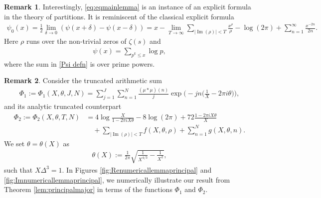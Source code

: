 \documentclass[11pt]{amsart}
\numberwithin{equation}{section}
\numberwithin{figure}{section}
\theoremstyle{definition}
\newtheorem{remark}{Remark}[section]
\begin{document}
\begin{remark}
Interestingly, \eqref{eq:eqmainlemma} is an instance of an explicit formula in the theory of partitions. It is reminiscent of the classical explicit formula
\begin{align*}
    \psi_0(x) = \frac{1}{2} \lim_{\delta \to 0} (\psi(x+\delta)-\psi(x-\delta)) = x - \lim_{T \to \infty}\sum_{\lvert \operatorname{Im}(\rho) \rvert <T} \frac{x^\rho}{\rho} - \log(2\pi) + \sum_{n=1}^{\infty} \frac{x^{-2n}}{2n}.
\end{align*}
Here $\rho$ runs over the non-trivial zeros of $\zeta(s)$ and
\begin{align}\label{Psi defn}
    \psi(x) = \sum_{p^k \leqslant x} \log p,
\end{align}
where the sum in \eqref{Psi defn} is over prime powers.
\end{remark}
\begin{remark}
Consider the truncated arithmetic sum
\begin{align*} %
    \Phi_1 := \Phi_{1}(X,\theta, J, N) = \sum_{j=1}^J \sum_{n=1}^N \frac{(\mu * \mu)(n)}{j} \exp\bigg( -jn \bigg(\frac{1}{X}-2\pi i \theta\bigg)\bigg),
\end{align*}
and its analytic truncated counterpart
\begin{align*} 
\Phi_2 := \Phi_{2}(X,\theta,T,N) &= 4 \log \frac{X}{1-2\pi i X\theta} - 8 \log(2 \pi) + 72 \frac{1-2\pi i X\theta}{X} \\
&\quad+ \sum_{\lvert \operatorname{Im}(\rho) \rvert < T}  f(X,\theta,\rho)  +\sum_{n=1}^{N} g(X,\theta,n) .
\end{align*}
We set $\theta=\theta(X)$ as
\begin{align*}
    \theta(X) := \frac{1}{2\pi} \sqrt{\frac{1}{X^{4/3}}-\frac{1}{X^2}},
\end{align*}
such that $X \Delta^3=1$. In Figures \ref{fig:Renumericallemmaprincipal} and \ref{fig:Imnumericallemmaprincipal}, we numerically illustrate our result from Theorem \ref{lem:principalmajor} in terms of the functions $\Phi_1$ and $\Phi_2$.
\end{remark}
\end{document}
